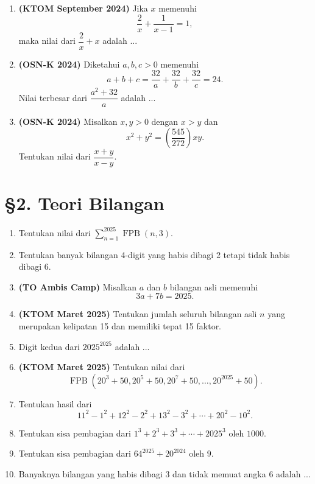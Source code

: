 \documentclass[a4paper,12pt]{article}
\begin{document}
\begin{enumerate}[label=\arabic*., leftmargin=*, align=left, itemsep=1.2cm]
    \item \textbf{(KTOM September 2024)}  
    Jika $x$ memenuhi
    \[
        \frac{2}{x} + \frac{1}{x - 1} = 1,
    \]
    maka nilai dari $\dfrac{2}{x} + x$ adalah ...
    
    \item \textbf{(OSN-K 2024)}  
    Diketahui $a, b, c > 0$ memenuhi
    \[
        a + b + c = \frac{32}{a} + \frac{32}{b} + \frac{32}{c} = 24.
    \]
    Nilai terbesar dari $\dfrac{a^{2} + 32}{a}$ adalah ...
    
    \item \textbf{(OSN-K 2024)}  
    Misalkan $x, y > 0$ dengan $x > y$ dan
    \[
        x^2 + y^2 = \left( \frac{545}{272} \right) xy.
    \]
    Tentukan nilai dari $\dfrac{x+y}{x-y}$.

\end{enumerate}

\section*{\color{orange}§2. \color{black}Teori Bilangan}

\begin{enumerate}[label=\arabic*., leftmargin=*, align=left, itemsep=1.2cm, resume]

    \item Tentukan nilai dari $\sum\limits_{n=1}^{2025} \operatorname{FPB}(n,3)$.

    \item Tentukan banyak bilangan 4-digit yang habis dibagi 2 tetapi tidak habis dibagi 6.

    \item \textbf{(TO Ambis Camp)}  
    Misalkan $a$ dan $b$ bilangan asli memenuhi
    \[
        3a + 7b = 2025.
    \]

    \item \textbf{(KTOM Maret 2025)}  
    Tentukan jumlah seluruh bilangan asli $n$ yang merupakan kelipatan 15 dan memiliki tepat 15 faktor.

    \item Digit kedua dari $2025^{2025}$ adalah ...

    \item \textbf{(KTOM Maret 2025)}  
    Tentukan nilai dari
    \[
        \operatorname{FPB}(20^3 + 50, 20^5 + 50, 20^7 + 50, \ldots, 20^{2025} + 50).
    \]

    \item Tentukan hasil dari
    \[
        11^2 - 1^2 + 12^2 - 2^2 + 13^2 - 3^2 + \cdots + 20^2 - 10^2.
    \]

    \item Tentukan sisa pembagian dari $1^3+2^3+3^3+\cdots+2025^3$ oleh $1000$.

    \item Tentukan sisa pembagian dari $64^{2025} + 20^{2024}$ oleh $9$.

    \item Banyaknya bilangan yang habis dibagi 3 dan tidak memuat angka 6 adalah ...
    
\end{enumerate}
\end{document}
